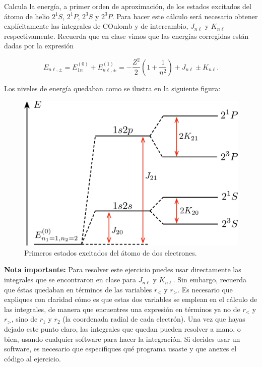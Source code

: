 \documentclass[./../main.tex]{subfiles}
\begin{document}
    \begin{exercise}
        Calcula la energía, a primer orden de aproximación, de los estados excitados del átomo de helio \(2^{1}S\), \(2^{1}P\), \(2^{3}S\) y \(2^{3}P\). Para hacer este cálculo será necesario obtener explícitamente las integrales de COulomb y de intercambio, \(J_{n\ell}\) y \(K_{n\ell}\) respectivamente. Recuerda que en clase vimos que las energías corregidas están dadas por la expresión

        \begin{equation*}
            E_{n\ell,\pm} = E_{1n}^{(0)} + E_{n\ell,\pm}^{(1)} = -\dfrac{Z^{2}}{2}\left(1 + \dfrac{1}{n^{2}}\right) + J_{n\ell} \pm K_{n\ell}.
        \end{equation*}

        Los niveles de energía quedaban como se ilustra en la siguiente figura:

        \begin{figure}[htb]
            \centering
            \includegraphics{first-excited-states}
            \caption{Primeros estados excitados del átomo de dos electrones.}
            \label{fig:first-excites-states-helium}
        \end{figure}

        \textbf{Nota importante:} Para resolver este ejercicio puedes usar directamente las integrales que se encontraron en clase para \(J_{n\ell}\) y \(K_{n\ell}\). Sin embargo, recuerda que éstas quedaban en términos de las variables \(r_{<}\) y \(r_{>}\). Es necesario que expliques con claridad cómo es que estas dos variables se emplean en el cálculo de las integrales, de manera que encuentres una expresión en términos ya no de \(r_{<}\) y \(r_{>}\), sino de \(r_{1}\) y \(r_{2}\) (\idest la coordenada radial de cada electrón). Una vez que hayas dejado este punto claro, las integrales que quedan pueden resolver a mano, o bien, usando cualquier software para hacer la integración. Si decides usar un software, es necesario que especifiques qué programa usaste y que anexes el código al ejercicio.
    \end{exercise}
\end{document}
